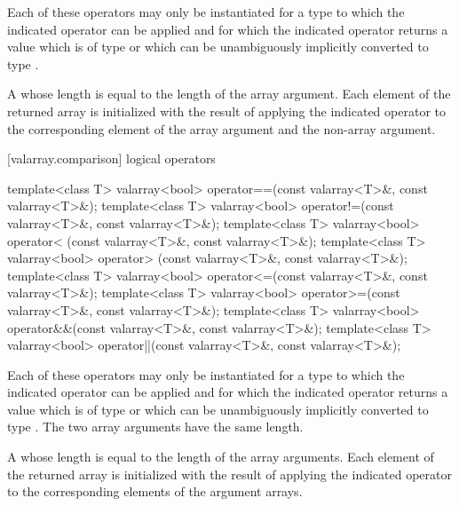 \begin{itemdescr}
\pnum
\requires
Each of these operators may only be instantiated for a type 
to which the indicated operator can be applied and for which
the indicated operator returns a value which is of type 
or which can be unambiguously implicitly converted to type .

\pnum
\returns
A  whose length is equal to the
length of the array argument.
Each element of the returned array is
initialized with the result of applying the indicated operator to the
corresponding element of the array argument and the non-array argument.
\end{itemdescr}

[valarray.comparison]{ logical operators}

%
%
%
%
%
%
%
%
\begin{itemdecl}
template<class T> valarray<bool> operator==(const valarray<T>&, const valarray<T>&);
template<class T> valarray<bool> operator!=(const valarray<T>&, const valarray<T>&);
template<class T> valarray<bool> operator< (const valarray<T>&, const valarray<T>&);
template<class T> valarray<bool> operator> (const valarray<T>&, const valarray<T>&);
template<class T> valarray<bool> operator<=(const valarray<T>&, const valarray<T>&);
template<class T> valarray<bool> operator>=(const valarray<T>&, const valarray<T>&);
template<class T> valarray<bool> operator&&(const valarray<T>&, const valarray<T>&);
template<class T> valarray<bool> operator||(const valarray<T>&, const valarray<T>&);
\end{itemdecl}

\begin{itemdescr}
\pnum
\requires
Each of these operators may only be instantiated for a type 
to which the indicated operator can be applied and for which
the indicated operator returns a value which is of type 
or which can be unambiguously implicitly converted to type .
The two array arguments have the same length.

\pnum
\returns
A  whose length
is equal to the length of the array arguments.
Each element of the returned
array is initialized with the result of applying the indicated
operator to the corresponding elements of the argument arrays.
\end{itemdescr}

